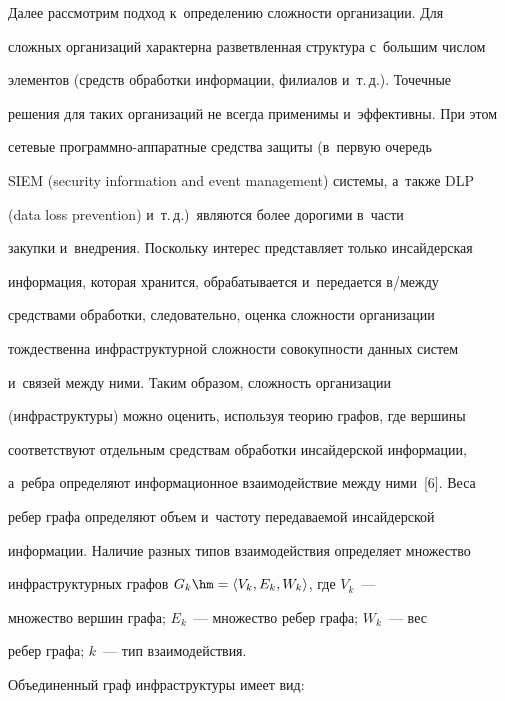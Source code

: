  




     


     Далее рассмотрим подход к~определению сложности организации. Для 


сложных организаций характерна разветвленная структура с~большим числом 


элементов (средств обработки информации, филиалов и~т.\,д.). Точечные 


решения для таких организаций не всегда применимы и~эффективны. При этом 


сетевые программно-аппаратные средства защиты (в~первую очередь  


SIEM (security information and event management) сис\-те\-мы, а~также DLP 


(data loss prevention) и~т.\,д.)\ являются более дорогими в~части 


закупки и~внед\-ре\-ния. Поскольку интерес представляет только инсайдерская 


информация, которая хранится, обрабатывается и~передается в/меж\-ду 


средствами обработки, следовательно, оценка сложности организации 


тождественна инфраструктурной сложности со\-во\-куп\-ности данных систем 


и~связей между ними. Таким образом, слож\-ность организации 


(инфраструктуры) можно оценить, используя теорию графов, где вершины 


соответствуют отдельным средствам обработки инсайдерской информации, 


а~реб\-ра определяют информационное взаимодействие между ними~[6]. Веса 


ребер графа определяют объем и~частоту передаваемой инсайдерской 


информации. Наличие разных типов взаимодействия определяет множество 


инфраструктурных графов $G_k\hm=\langle V_k, E_k, W_k\rangle$, где $V_k$~--- 


множество вершин графа; $E_k$~--- множество ребер графа; $W_k$~--- вес 


ребер графа; $k$~--- тип взаимодействия.


     


     Объединенный граф инфраструктуры имеет вид:  


$$


